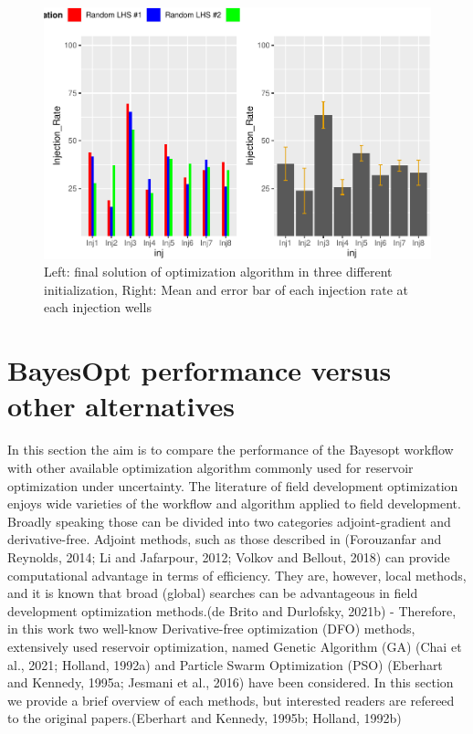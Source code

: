 \documentclass[]{elsarticle} %
\begin{document}
\begin{figure}

{\centering \includegraphics[width=0.9\linewidth]{0_Paper1_main_files/figure-latex/diffu-1} 

}

\caption{Left: final solution of optimization algorithm in three different initialization, Right: Mean and error bar of each injection rate at each injection wells}\label{fig:diffu}
\end{figure}

\newpage

\newpage

\hypertarget{bayesopt-performance-versus-other-alternatives}{%
\section{BayesOpt performance versus other alternatives}\label{bayesopt-performance-versus-other-alternatives}}

In this section the aim is to compare the performance of the Bayesopt workflow with other available optimization algorithm commonly used for reservoir optimization under uncertainty. The literature of field development optimization enjoys wide varieties of the workflow and algorithm applied to field development. Broadly speaking those can be divided into two categories adjoint-gradient and derivative-free. Adjoint methods, such as those described in (Forouzanfar and Reynolds, 2014; Li and Jafarpour, 2012; Volkov and Bellout, 2018) can provide computational advantage in terms of efficiency. They are, however, local methods, and it is known that broad (global) searches can be advantageous in field development optimization methods.(de Brito and Durlofsky, 2021b) - Therefore, in this work two well-know Derivative-free optimization (DFO) methods, extensively used reservoir optimization, named Genetic Algorithm (GA) (Chai et al., 2021; Holland, 1992a) and Particle Swarm Optimization (PSO) (Eberhart and Kennedy, 1995a; Jesmani et al., 2016) have been considered. In this section we provide a brief overview of each methods, but interested readers are refereed to the original papers.(Eberhart and Kennedy, 1995b; Holland, 1992b)
\end{document}
